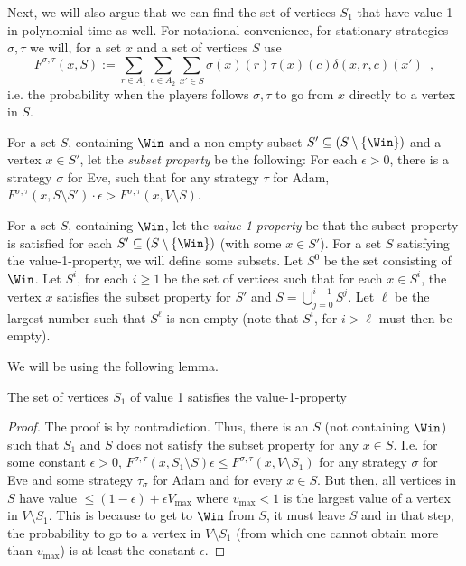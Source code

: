 Next, we will also argue that we can find the set of vertices $S_1$ that have value 1 in polynomial time as well.
For notational convenience, for stationary strategies $\sigma,\tau$ we will, for a set $x$ and a set of vertices $S$ use \[
F^{\sigma,\tau}(x,S):=\sum_{r\in A_1}\sum_{c\in A_2}\sum_{x'\in S}\sigma(x)(r)\tau(x)(c)\delta(x,r,c)(x')\enspace ,\]
 i.e. the probability when the players follows $\sigma,\tau$ to go from $x$ directly to a vertex in $S$.

For a set $S$, containing $\Win$ and a non-empty subset $S'\subseteq(S\setminus \{\Win\})$ and a vertex $x\in S'$, let the {\em subset property} be the following:
For each $\epsilon>0$, there is a strategy $\sigma$ for Eve, such that for any strategy $\tau$ for Adam, $F^{\sigma,\tau}(x,S\setminus S')\cdot \epsilon >F^{\sigma,\tau}(x,V\setminus S)$.

For a set $S$, containing $\Win$, let the {\em value-1-property} be that the subset property is satisfied for each $S'\subseteq(S\setminus \{\Win\})$ (with some $x\in S'$).
For a set $S$ satisfying the value-1-property, we will define some subsets.
Let $S^0$ be the set consisting of $\Win$.
Let $S^i$, for each $i\geq 1$ be the set of vertices such that for each $x\in S^i$,
the vertex $x$ satisfies the subset property for $S'$ and $S=\bigcup_{j=0}^{i-1}S^j$.
Let $\ell$ be the largest number such that $S^\ell$ is non-empty (note that $S^i$, for $i>\ell$ must then be empty).


We will be using the following lemma.



\begin{lemma}
The set of vertices $S_1$ of value 1 satisfies the value-1-property
\end{lemma}
\begin{proof}
The proof is by contradiction. Thus, there is an $S$ (not containing $\Win$) such that $S_1$ and $S$ does not satisfy the subset property for any $x\in S$. I.e. for some constant $\epsilon>0$,
$F^{\sigma,\tau}(x,S_1\setminus S)\epsilon \leq F^{\sigma,\tau}(x,V\setminus S_1)$ for any strategy $\sigma$ for Eve and some strategy $\tau_{\sigma}$ for Adam and for every $x\in S$.
But then, all vertices in $S$ have value $\leq (1-\epsilon)+\epsilon V_{\max}$ where $v_{\max}<1$ is the largest value of a vertex in $V\setminus S_1$.
This is because to get to $\Win$ from $S$, it must leave $S$ and in that step, the probability to go to a vertex in  $V\setminus S_1$ (from which one cannot obtain more than $v_{\max}$) is at least the constant $\epsilon$.  
\end{proof}


